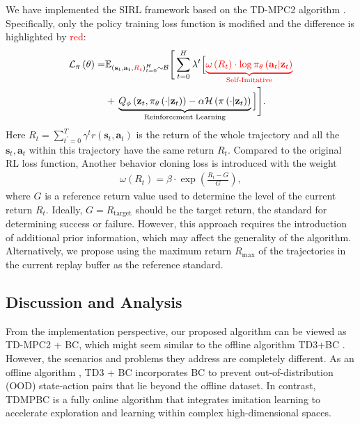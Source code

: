 We have implemented the SIRL framework based on the TD-MPC2 algorithm \citep{hansen2023td}. 
Specifically, only the policy training loss function is modified and the difference is highlighted by \textcolor{red}{red}:
\begin{align}\label{eq:loss}
    \nonumber \mathcal{L}_{\pi}\left(\theta\right) = &\mathbb{E}_{\left(\mathbf{s}_t, \mathbf{a}_t, \textcolor{red}{R_t}\right)_{t=0}^{H} \sim \mathcal{B}} \Bigg[\sum_{t=0}^{H}\lambda^t\Big[
    \textcolor{red}{\underbrace{\omega\left(R_t\right)\cdot\log \pi_{\theta}\left(\mathbf{a}_t|\mathbf{z}_t\right)
    }_{\text{Self-Imitative}}}
     \Big.\Bigg.\\
    &+\Big.\Bigg. \underbrace{Q_{\phi}\left(\mathbf{z}_t, \pi_{\theta}\left(\cdot|\mathbf{z}_t\right)\right) - \alpha\mathcal{H}\left(\pi\left(\cdot|\mathbf{z}_t\right)\right)}_{\text{Reinforcement Learning}}\Big]\Bigg].
\end{align}
Here $R_t=\sum_{t^{\prime}=0}^{T} \gamma^t r(\mathbf{s}_t, \mathbf{a}_t)$ is the return of the 
whole trajectory and all the $\mathbf{s}_t, \mathbf{a}_t$ within this trajectory have the same return $R_t$.
Compared to the original RL loss function, Another behavior cloning loss is introduced with the weight
\begin{align}
    \omega\left(R_t\right) = \beta \cdot \exp{\left(\frac{R_t - G}{G}\right)},
\end{align}
where $G$ is a reference return value used to determine the level of the current return $R_t$.
Ideally, $G=R_{\text{target}}$ should be the target return, the standard for determining success or failure. 
However, this approach requires the introduction of additional prior information, which may affect the generality of the algorithm. 
Alternatively, we propose using the maximum return $R_{\text{max}}$ of the trajectories in the current replay buffer as the reference standard. 

\subsection{Discussion and Analysis}
From the implementation perspective, our proposed algorithm can be viewed as TD-MPC2 + BC, which might seem similar to the offline algorithm TD3+BC \citep{fujimoto2021minimalist}. 
However, the scenarios and problems they address are completely different. 
As an offline algorithm \citep{zhuang2023behavior, fujimoto2019off, kumar2020conservative}, TD3 + BC incorporates BC \citep{pomerleau1988alvinn} to prevent out-of-distribution (OOD) state-action pairs that lie beyond the offline dataset. 
In contrast, TDMPBC is a fully online algorithm that integrates imitation learning to accelerate exploration and learning within complex high-dimensional spaces.

